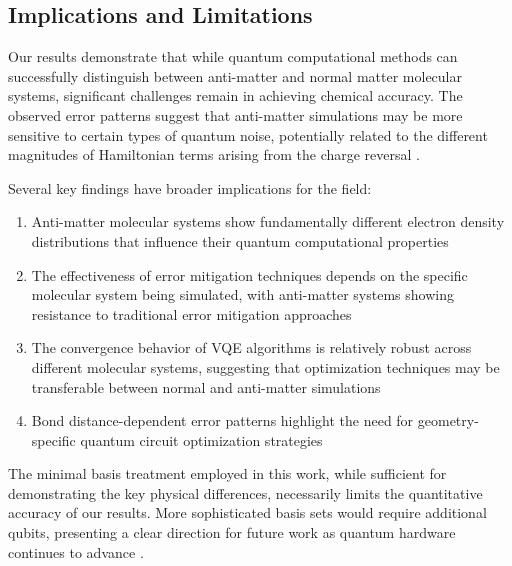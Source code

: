\documentclass[10pt,twocolumn,a4paper]{article}
\begin{document}
\subsection{Implications and Limitations}
Our results demonstrate that while quantum computational methods can successfully distinguish between anti-matter and normal matter molecular systems, significant challenges remain in achieving chemical accuracy. The observed error patterns suggest that anti-matter simulations may be more sensitive to certain types of quantum noise, potentially related to the different magnitudes of Hamiltonian terms arising from the charge reversal \cite{cerezo2021variational}.

Several key findings have broader implications for the field:

\begin{enumerate}
    \item Anti-matter molecular systems show fundamentally different electron density distributions that influence their quantum computational properties
    
    \item The effectiveness of error mitigation techniques depends on the specific molecular system being simulated, with anti-matter systems showing resistance to traditional error mitigation approaches
    
    \item The convergence behavior of VQE algorithms is relatively robust across different molecular systems, suggesting that optimization techniques may be transferable between normal and anti-matter simulations
    
    \item Bond distance-dependent error patterns highlight the need for geometry-specific quantum circuit optimization strategies
\end{enumerate}

The minimal basis treatment employed in this work, while sufficient for demonstrating the key physical differences, necessarily limits the quantitative accuracy of our results. More sophisticated basis sets would require additional qubits, presenting a clear direction for future work as quantum hardware continues to advance \cite{cao2019quantum}.
\end{document}
